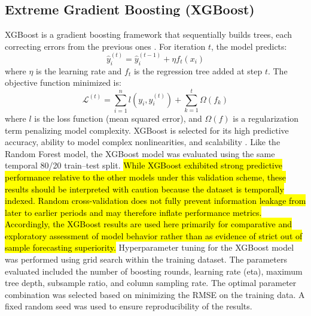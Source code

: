 \documentclass[10pt,letterpaper]{article}
\begin{document}
\subsection{Extreme Gradient Boosting (XGBoost)}

XGBoost is a gradient boosting framework that sequentially builds trees, each correcting errors from the previous ones \cite{nielsen2016tree}. For iteration \(t\), the model predicts:
\begin{equation}
\hat{y}_i^{(t)} = \hat{y}_i^{(t-1)} + \eta f_t(x_i)
\end{equation}
where \( \eta \) is the learning rate and \(f_t\) is the regression tree added at step \(t\). The objective function minimized is:
\begin{equation}
\mathcal{L}^{(t)} = \sum_{i=1}^n l(y_i, \hat{y}_i^{(t)}) + \sum_{k=1}^t \Omega(f_k)
\end{equation}
where \(l\) is the loss function (mean squared error), and \(\Omega(f)\) is a regularization term penalizing model complexity. XGBoost is selected for its high predictive accuracy, ability to model complex nonlinearities, and scalability \cite{dong2024fast}. Like the Random Forest model, the XGBoost model was evaluated using the same temporal 80/20 train–test split. \hl{While XGBoost exhibited strong predictive performance relative to the other models under this validation scheme, these results should be interpreted with caution because the dataset is temporally indexed. Random cross-validation does not fully prevent information leakage from later to earlier periods and may therefore inflate performance metrics. Accordingly, the XGBoost results are used here primarily for comparative and exploratory assessment of model behavior rather than as evidence of strict out of sample forecasting superiority.} 
Hyperparameter tuning for the XGBoost model was performed using grid search within the training dataset. The parameters evaluated included the number of boosting rounds, learning rate (eta), maximum tree depth, subsample ratio, and column sampling rate. The optimal parameter combination was selected based on minimizing the RMSE on the training data. A fixed random seed was used to ensure reproducibility of the results.

\end{document}
